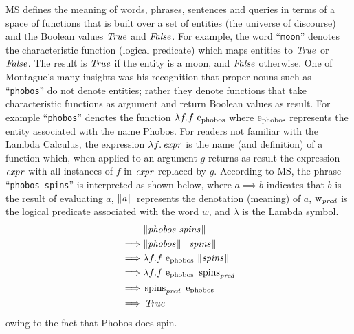 \documentclass[../main.tex]{subfiles}
\begin{document}
\begin{refsection}
MS \cite{Dowty:wall} defines the meaning of words, phrases, sentences and queries in terms of a space of functions that is
built over a set of entities (the universe of discourse) and the Boolean values $\operatorname{\mathit{True}}$ and $\operatorname{\mathit{False}}$. For
example, the word ``\texttt{moon}'' denotes the characteristic function (logical predicate) which maps entities to
$\operatorname{\mathit{True}}$ or $\operatorname{\mathit{False}}$. The result is $\operatorname{\mathit{True}}$ if the entity is a moon, and $\operatorname{\mathit{False}}$ otherwise. One of Montague's many insights was his recognition that proper nouns such as ``\texttt{phobos}'' do not denote entities; rather they
denote functions that take characteristic functions as argument and return Boolean values as result. For
example ``\texttt{phobos}'' denotes the function $\lambda f.f \ \entityassoc{\phobos}$ where $\mathrm{e}_{\operatorname{\operatorname{phobos}}}$ represents the entity associated with
the name Phobos. For readers not familiar with the Lambda Calculus, the expression $\lambda f.\operatorname{\mathit{expr}}$ is the
name (and definition) of a function which, when applied to an argument $g$ returns as result the
expression $\operatorname{\mathit{expr}}$ with all instances of $f$ in $\operatorname{\mathit{expr}}$ replaced by $g$. According to MS, the phrase ``\texttt{phobos
spins}'' is interpreted as shown below, where $a \implies b$ indicates that $b$ is the result of evaluating $a$, $\lVert\textit{a\hspace{0.1em}}\rVert$
represents the denotation (meaning) of $a$, $\operatorname{w}_{\operatorname{\mathit{pred}}}$ is the logical predicate associated with the word $w$,
and $\lambda$ is the Lambda symbol.
\begin{equation*}
	\begin{split}
		& \meaningof{phobos spins} \\
		\implies&  \meaningof{phobos}\ \meaningof{spins} \\
		\implies&  \lambda f.f \ \entityassoc{phobos} \ \meaningof{spins} \\
		\implies&  \lambda f.f \ \entityassoc{phobos} \ \wordpred{spins} \\
		\implies&  \wordpred{\spins} \ \entityassoc{phobos} \\
		\implies&  \True
	\end{split}
\end{equation*}
owing to the fact that Phobos does spin.


\end{refsection}
\end{document}
